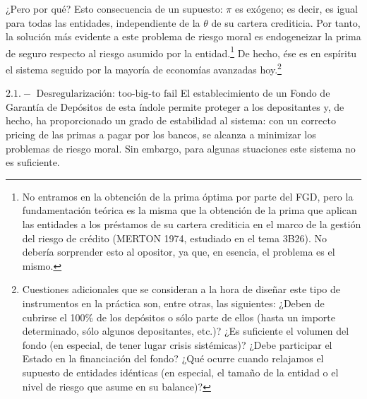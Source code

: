 \documentclass[10pt,a4paper]{article}
\begin{document}
¿Pero por qué? Esto consecuencia de un supuesto:  $\pi$ es exógeno; es decir, es igual para todas las entidades, independiente de la $\theta$ de su cartera crediticia. Por tanto, la solución más evidente a este problema de riesgo moral es endogeneizar la prima de seguro respecto al riesgo asumido por la entidad.\footnote{%
    No entramos en la obtención de la prima óptima por parte del FGD, pero la fundamentación teórica es la misma que la obtención de la prima que aplican las entidades a los préstamos de su cartera crediticia en el marco de la gestión del riesgo de crédito (MERTON 1974, estudiado en el tema 3B26). No debería sorprender esto al opositor, ya que, en esencia, el problema es el mismo.
} De hecho, ése es en espíritu el sistema seguido por la mayoría de economías avanzadas hoy.\footnote{%
    Cuestiones adicionales que se consideran a la hora de diseñar este tipo de instrumentos en la práctica son, entre otras, las siguientes: ¿Deben de cubrirse el 100\% de los depósitos o sólo parte de ellos (hasta un importe determinado, sólo algunos depositantes, etc.)? ¿Es suficiente el volumen del fondo (en especial, de tener lugar crisis sistémicas)? ¿Debe participar el Estado en la financiación del fondo? ¿Qué ocurre cuando relajamos el supuesto de entidades idénticas (en especial, el tamaño de la entidad o el nivel de riesgo que asume en su balance)?
}

$\mathbf{2.1.-}\text{ Desregularización: too-big-to fail}$
El establecimiento de un Fondo de Garantía de Depósitos de esta índole permite proteger a los depositantes y, de hecho, ha proporcionado un grado de estabilidad al sistema: con un correcto pricing de las primas a pagar por los bancos, se alcanza a minimizar los problemas de riesgo moral. Sin embargo, para algunas stuaciones este sistema no es suficiente.
\end{document}
